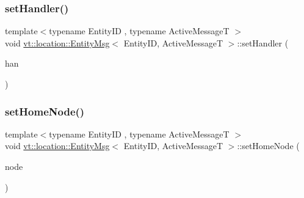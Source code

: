 \subsubsection{\texorpdfstring{set\+Handler()}{setHandler()}}
{\footnotesize\ttfamily template$<$typename Entity\+ID , typename Active\+MessageT $>$ \\
void \hyperlink{structvt_1_1location_1_1_entity_msg}{vt\+::location\+::\+Entity\+Msg}$<$ Entity\+ID, Active\+MessageT $>$\+::set\+Handler (\begin{DoxyParamCaption}\item[{\hyperlink{namespacevt_af64846b57dfcaf104da3ef6967917573}{Handler\+Type} const}]{han }\end{DoxyParamCaption})\hspace{0.3cm}{\ttfamily [inline]}}

\mbox{\label{structvt_1_1location_1_1_entity_msg_af2111f7feda34a83a2132d396647f77f}} 
\subsubsection{\texorpdfstring{set\+Home\+Node()}{setHomeNode()}}
{\footnotesize\ttfamily template$<$typename Entity\+ID , typename Active\+MessageT $>$ \\
void \hyperlink{structvt_1_1location_1_1_entity_msg}{vt\+::location\+::\+Entity\+Msg}$<$ Entity\+ID, Active\+MessageT $>$\+::set\+Home\+Node (\begin{DoxyParamCaption}\item[{\hyperlink{namespacevt_a866da9d0efc19c0a1ce79e9e492f47e2}{Node\+Type} const \&}]{node }\end{DoxyParamCaption})\hspace{0.3cm}{\ttfamily [inline]}}

\mbox{\label{structvt_1_1location_1_1_entity_msg_afd28b1e836177cb58d112b25edce1210}} 

